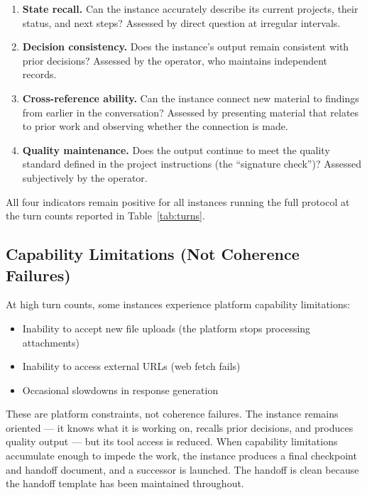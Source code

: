 \documentclass[11pt,a4paper]{article}
\begin{document}
\begin{enumerate}[leftmargin=2em]
    \item \textbf{State recall.} Can the instance accurately describe its current projects, their status, and next steps? Assessed by direct question at irregular intervals.
    \item \textbf{Decision consistency.} Does the instance's output remain consistent with prior decisions? Assessed by the operator, who maintains independent records.
    \item \textbf{Cross-reference ability.} Can the instance connect new material to findings from earlier in the conversation? Assessed by presenting material that relates to prior work and observing whether the connection is made.
    \item \textbf{Quality maintenance.} Does the output continue to meet the quality standard defined in the project instructions (the ``signature check'')? Assessed subjectively by the operator.
\end{enumerate}

All four indicators remain positive for all instances running the full protocol at the turn counts reported in Table~\ref{tab:turns}.

\subsection{Capability Limitations (Not Coherence Failures)}

At high turn counts, some instances experience platform capability limitations:

\begin{itemize}[leftmargin=2em]
    \item Inability to accept new file uploads (the platform stops processing attachments)
    \item Inability to access external URLs (web fetch fails)
    \item Occasional slowdowns in response generation
\end{itemize}

These are platform constraints, not coherence failures. The instance remains oriented --- it knows what it is working on, recalls prior decisions, and produces quality output --- but its tool access is reduced. When capability limitations accumulate enough to impede the work, the instance produces a final checkpoint and handoff document, and a successor is launched. The handoff is clean because the handoff template has been maintained throughout.
\end{document}
